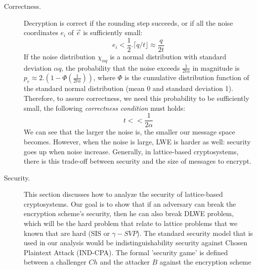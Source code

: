 \begin{description}
\begin{description}
                \item [Correctness.] Decryption is correct if the rounding step
                    succeeds, or if all the noise coordinates $e_i$ of
                    $\vec{e}$ is sufficiently small:
                    \[
                        e_i < \frac{1}{2} . \lceil q/t \rfloor \approx
                        \frac{q}{2t}
                    \]
                    If the noise distribution $\chi_{\alpha q}$ is a normal
                    distribution with standard deviation $\alpha q$, the
                    probability that the noise exceeds $\frac{1}{2t\alpha}$ in
                    magnitude is $p_e \approx 2.\left( 1 - \Phi\left(
                            \frac{1}{2t\alpha}
                    \right) \right)$, where $\Phi$ is the cumulative
                    distribution function of the standard normal distribution
                    (mean 0 and standard deviation 1). Therefore, to assure
                    correctness, we need this probability to be sufficiently
                    small, the following \emph{correctness condition} must
                    holds:
                    \[
                        t << \frac{1}{2\alpha}
                    \]
                    We can see that the larger the noise is, the smaller our
                    message space becomes. However, when the noise is large, LWE
                    is harder as well: security goes up when noise increase.
                    Generally, in lattice-based cryptosystems, there is this
                    trade-off between security and the size of messages to
                    encrypt.

                \item [Security.] This section discusses how to analyze the
                    security of lattice-based cryptosystems. Our goal is to show
                    that if an adversary can break the encryption scheme's
                    security, then he can also break DLWE problem, which will be
                    the hard problem that relate to lattice problems that we
                    known that are hard (SIS or $\gamma-SVP$). The standard
                    security model that is used in our analysis would be
                    indistinguishability security against Chosen Plaintext
                    Attack (IND-CPA). The formal 'security game' is defined between a
                    challenger $Ch$ and the attacker $B$ against the encryption
                    scheme


\end{description}
\end{description}

